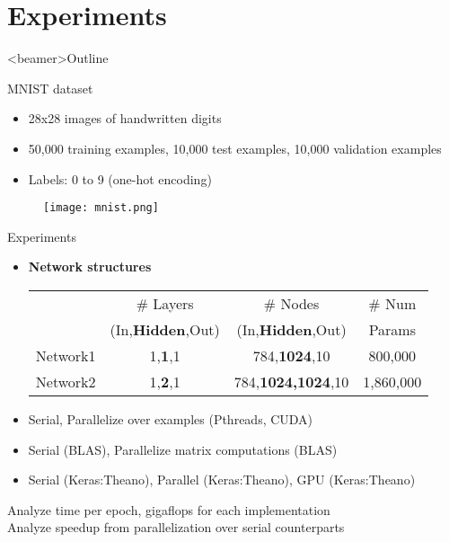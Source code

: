 \section{Experiments}

\begin{frame}<beamer>{Outline}
\end{frame}

\begin{frame}{MNIST dataset}

    \begin{itemize}
    \item 28x28 images of handwritten digits
    \item 50,000 training examples, 10,000 test examples, 10,000 validation examples
    \item Labels: 0 to 9 (one-hot encoding)
    \end{itemize}
    
    \begin{figure}[!tbp]
		\begin{center}
    	\texttt{[image: mnist.png]}
		\end{center}
	\end{figure}
    
\end{frame}
    
\begin{frame}{Experiments}

	\begin{itemize}
    \item{ \textbf{Network structures} }
		\begin{center}
		\begin{tabular}{ | l | c | c | c | }
		\hline
		& \cellcolor[gray]{0.85} \# Layers & \cellcolor[gray]{0.85} \# Nodes & \cellcolor[gray]{0.85} \# Num \\
		& \cellcolor[gray]{0.85} (In,\textbf{Hidden},Out) & \cellcolor[gray]{0.85} (In,\textbf{Hidden},Out) &\cellcolor[gray]{0.85} Params \\ \hline
		Network1 & 1,\textbf{1},1 & 784,\textbf{1024},10 & 800,000 \\ 
		\hline 
		Network2 & 1,\textbf{2},1 & 784,\textbf{1024,1024},10 & 1,860,000 \\
		\hline
		\end{tabular}
		\end{center}
	\end{itemize}
	
	\begin{itemize}
	\item Serial, Parallelize over examples (Pthreads, CUDA)
	\item Serial (BLAS), Parallelize matrix computations (BLAS)
	\item Serial (Keras:Theano), Parallel (Keras:Theano), GPU (Keras:Theano)
	\end{itemize}
	
	Analyze time per epoch, gigaflops for each implementation \\
	Analyze speedup from parallelization over serial counterparts

\end{frame}

